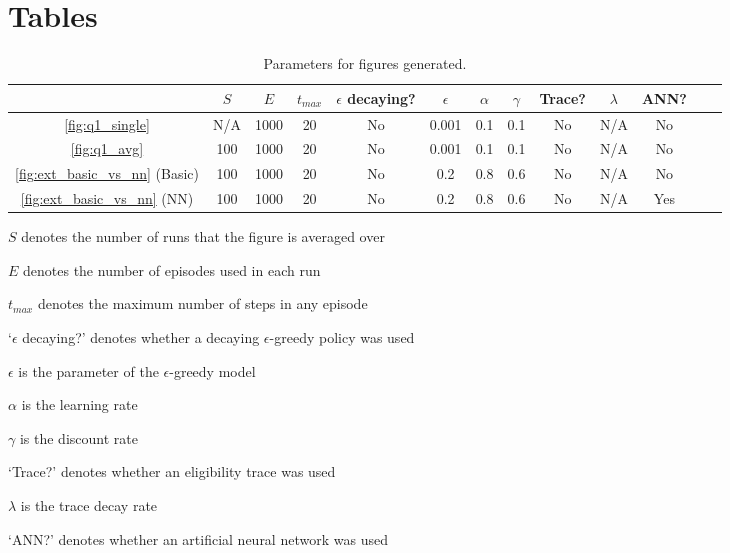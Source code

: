 \documentclass[a4paper, 11pt, twocolumn, final]{article} %
\begin{document}
\onecolumn \appendix

\section{Tables}
\begin{table}[H]
  \centering
  \begin{tabular}{c | c c c c c c c c c c c c}
    \hline
    & $S$ & $E$ & $t_{max}$ & $\epsilon$ decaying? & $\epsilon$ & $\alpha$ &
      $\gamma$ & Trace? & $\lambda$ & ANN? \\
    \hline
    \autoref{fig:q1_single} & N/A & 1000 & 20 & No & 0.001 & 0.1 & 0.1 & No &
      N/A & No \\
    \autoref{fig:q1_avg} & 100 & 1000 & 20 & No & 0.001 & 0.1 & 0.1 & No &
      N/A & No \\
    \autoref{fig:ext_basic_vs_nn} (Basic) & 100 & 1000 & 20 & No & 0.2 & 0.8 &
      0.6 & No & N/A & No \\
    \autoref{fig:ext_basic_vs_nn} (NN) & 100 & 1000 & 20 & No & 0.2 & 0.8 &
      0.6 & No & N/A & Yes \\
    \hline
  \end{tabular}
  \caption{Parameters for figures generated.}
  \label{tab:parameters}
\end{table}

\begin{itemize*}
  \item $S$ denotes the number of runs that the figure is averaged over
  \item $E$ denotes the number of episodes used in each run
  \item $t_{max}$ denotes the maximum number of steps in any episode
  \item `$\epsilon$ decaying?' denotes whether a decaying $\epsilon$-greedy
    policy was used
  \item $\epsilon$ is the parameter of the $\epsilon$-greedy model
  \item $\alpha$ is the learning rate
  \item $\gamma$ is the discount rate
  \item `Trace?' denotes whether an eligibility trace was used
  \item $\lambda$ is the trace decay rate
  \item `ANN?' denotes whether an artificial neural network was used
\end{itemize*}
\end{document}

